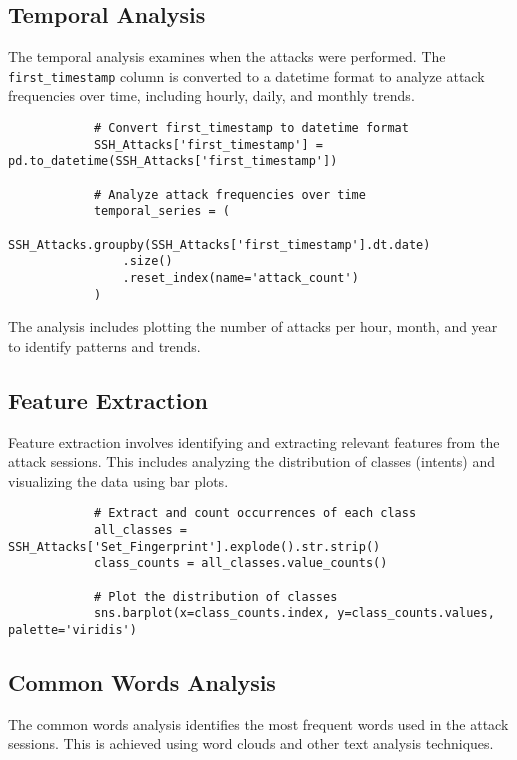     \subsection{Temporal Analysis}
    
        The temporal analysis examines when the attacks were performed. The \texttt{first\_timestamp} column is converted to a datetime format to analyze attack frequencies over time, including hourly, daily, and monthly trends.

        \begin{verbatim}
            # Convert first_timestamp to datetime format
            SSH_Attacks['first_timestamp'] = pd.to_datetime(SSH_Attacks['first_timestamp'])

            # Analyze attack frequencies over time
            temporal_series = (
                SSH_Attacks.groupby(SSH_Attacks['first_timestamp'].dt.date)
                .size()
                .reset_index(name='attack_count')
            )
        \end{verbatim}

        The analysis includes plotting the number of attacks per hour, month, and year to identify patterns and trends.

    \subsection{Feature Extraction}
    
        Feature extraction involves identifying and extracting relevant features from the attack sessions. This includes analyzing the distribution of classes (intents) and visualizing the data using bar plots.

        \begin{verbatim}
            # Extract and count occurrences of each class
            all_classes = SSH_Attacks['Set_Fingerprint'].explode().str.strip()
            class_counts = all_classes.value_counts()

            # Plot the distribution of classes
            sns.barplot(x=class_counts.index, y=class_counts.values, palette='viridis')
        \end{verbatim}

    \subsection{Common Words Analysis}
    
        The common words analysis identifies the most frequent words used in the attack sessions. This is achieved using word clouds and other text analysis techniques.

